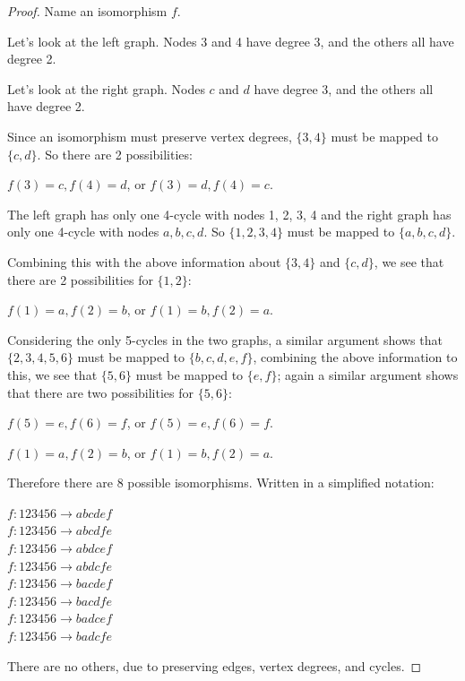 \documentclass[14pt]{extarticle}
\begin{document}
\begin{proof}
Name an isomorphism $f$.

Let's look at the left graph. Nodes 3 and 4 have degree 3, and the others all have degree 2.

Let's look at the right graph. Nodes $c$ and $d$ have degree 3, and the others all have degree 2.

Since an isomorphism must preserve vertex degrees, $\{3, 4\}$ must be mapped to $\{c, d\}$. So there are 2 possibilities:

\begin{center}
$f(3) = c, f(4) = d$, or $f(3) = d, f(4) = c$.
\end{center}

The left graph has only one 4-cycle with nodes 1, 2, 3, 4 and the right graph has only one 4-cycle with nodes $a, b, c, d$. So $\{1,2,3,4\}$ must be mapped to $\{a,b,c,d\}$. 

Combining this with the above information about $\{3, 4\}$ and $\{c, d\}$, we see that there are 2 possibilities for $\{1,2\}$:

\begin{center}
$f(1) = a, f(2) = b$, or $f(1) = b, f(2) = a$.
\end{center}

Considering the only 5-cycles in the two graphs, a similar argument shows that $\{2,3,4,5,6\}$ must be mapped to $\{b,c,d,e,f\}$,  combining the above information to this, we see that $\{5,6\}$ must be mapped to $\{e,f\}$; again a similar argument shows that there are two possibilities for $\{5,6\}$:

\begin{center}
$f(5) = e, f(6) = f$, or $f(5) = e, f(6) = f$.
\end{center}

\begin{center}
$f(1) = a, f(2) = b$, or $f(1) = b, f(2) = a$.
\end{center}

Therefore there are 8 possible isomorphisms. Written in a simplified notation:
\begin{center}
$f: 123456 \to abcdef$\\
$f: 123456 \to abcdfe$\\
$f: 123456 \to abdcef$\\
$f: 123456 \to abdcfe$\\
$f: 123456 \to bacdef$\\
$f: 123456 \to bacdfe$\\
$f: 123456 \to badcef$\\
$f: 123456 \to badcfe$
\end{center}
There are no others, due to preserving edges, vertex degrees, and cycles.
\end{proof}
\end{document}
